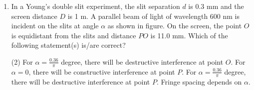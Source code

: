 
\begin{enumerate}
    \item In a Young's double slit experiment, the slit separation \(d\) is 0.3 mm and the screen distance \(D\) is 1 m. A parallel beam of light of wavelength 600 nm is incident on the slits at angle \(\alpha\) as shown in figure. On the screen, the point \(O\) is equidistant from the slits and distance \(PO\) is 11.0 mm. Which of the following statement(s) is/are correct?
        \begin{tasks}(2)
            	\task For \(\alpha = \frac{0.36}{\pi}\) degree, there will be destructive interference at point \(O\).
            	\task For \(\alpha = 0\), there will be constructive interference at point \(P\).
            	\task For \(\alpha = \frac{0.36}{\pi}\) degree, there will be destructive interference at point \(P\).
            	\task Fringe spacing depends on \(\alpha\).
        \end{tasks}
\end{enumerate}
\begin{center}
\end{center}
